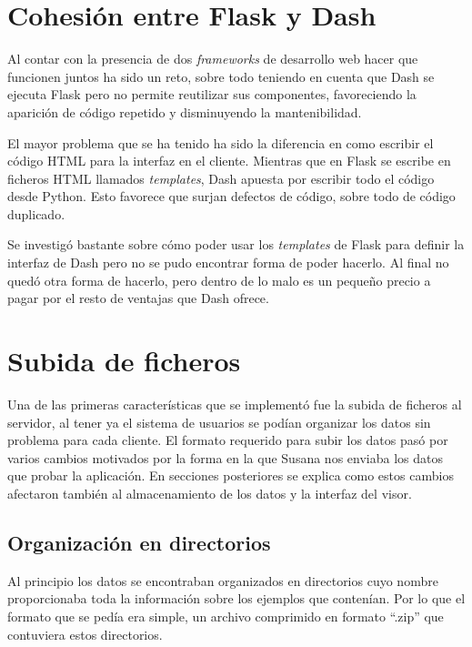 \section{Cohesión entre Flask y Dash}

Al contar con la presencia de dos \textit{frameworks} de desarrollo web hacer
que funcionen juntos ha sido un reto, sobre todo teniendo en cuenta que Dash se
ejecuta Flask pero no permite reutilizar sus componentes, favoreciendo la
aparición de código repetido y disminuyendo la mantenibilidad.

El mayor problema que se ha tenido ha sido la diferencia en como escribir el
código HTML para la interfaz en el cliente. Mientras que en Flask se escribe en
ficheros HTML llamados \textit{templates}, Dash apuesta por escribir todo el
código desde Python. Esto favorece que surjan defectos de código, sobre todo de
código duplicado.

Se investigó bastante sobre cómo poder usar los \textit{templates} de Flask para
definir la interfaz de Dash pero no se pudo encontrar forma de poder hacerlo. Al
final no quedó otra forma de hacerlo, pero dentro de lo malo es un pequeño
precio a pagar por el resto de ventajas que Dash ofrece.

\section{Subida de ficheros}\label{sec:subida}

Una de las primeras características que se implementó fue la subida de ficheros
al servidor, al tener ya el sistema de usuarios se podían organizar los datos
sin problema para cada cliente. El formato requerido para subir los datos pasó
por varios cambios motivados por la forma en la que Susana nos enviaba los datos
que probar la aplicación. En secciones posteriores se explica como estos cambios
afectaron también al almacenamiento de los datos y la interfaz del visor.

\subsection{Organización en directorios}\label{sec:directorios}

Al principio los datos se encontraban organizados en directorios cuyo nombre
proporcionaba toda la información sobre los ejemplos que contenían. Por lo que
el formato que se pedía era simple, un archivo comprimido en formato ``.zip''
que contuviera estos directorios.

